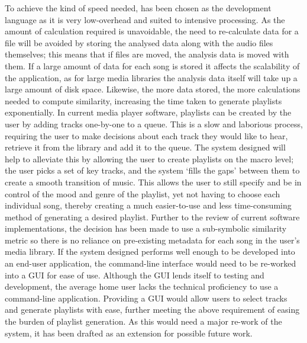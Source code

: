 To achieve the kind of speed needed,  has been chosen as the development language as it is very low-overhead and suited to intensive processing. As the amount of calculation required is unavoidable, the need to re-calculate data for a file will be avoided by storing the analysed data along with the audio files themselves; this means that if files are moved, the analysis data is moved with them.
\label{text:spec:requirement:data}
If a large amount of data for each song is stored it affects the scalability of the application, as for large media libraries the analysis data itself will take up a large amount of disk space. Likewise, the more data stored, the more calculations needed to compute similarity, increasing the time taken to generate playlists exponentially.
In current media player software, playlists can be created by the user by adding tracks one-by-one to a queue. This is a slow and laborious process, requiring the user to make decisions about each track they would like to hear, retrieve it from the library and add it to the queue. The system designed will help to alleviate this by allowing the user to create playlists on the macro level; the user picks a set of key tracks, and the system `fills the gaps' between them to create a smooth transition of music. This allows the user to still specify and be in control of the mood and genre of the playlist, yet not having to choose each individual song, thereby creating a much easier-to-use and less time-consuming method of generating a desired playlist.
Further to the review of current software implementations, the decision has been made to use a sub-symbolic similarity metric so there is no reliance on pre-existing metadata for each song in the user's media library.
If the system designed performs well enough to be developed into an end-user application, the command-line interface would need to be re-worked into a GUI for ease of use. Although the GUI lends itself to testing and development, the average home user lacks the technical proficiency to use a command-line application. Providing a GUI would allow users to select tracks and generate playlists with ease, further meeting the above requirement of easing the burden of playlist generation. As this would need a major re-work of the system, it has been drafted as an extension for possible future work.
